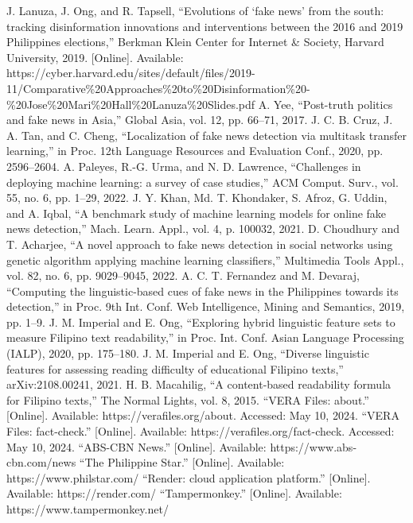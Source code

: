 \documentclass[conference]{IEEEtran}
\begin{document}
\begin{thebibliography}{00}
 J. Lanuza, J. Ong, and R. Tapsell, ``Evolutions of `fake news' from the south: tracking disinformation innovations and interventions between the 2016 and 2019 Philippines elections,'' Berkman Klein Center for Internet \& Society, Harvard University, 2019. [Online]. Available: https://cyber.harvard.edu/sites/default/files/2019-11/Comparative\%20Approaches\%20to\%20Disinformation\%20-\%20Jose\%20Mari\%20Hall\%20Lanuza\%20Slides.pdf
 A. Yee, ``Post-truth politics and fake news in Asia,'' Global Asia, vol. 12, pp. 66--71, 2017.
 J. C. B. Cruz, J. A. Tan, and C. Cheng, ``Localization of fake news detection via multitask transfer learning,'' in Proc. 12th Language Resources and Evaluation Conf., 2020, pp. 2596--2604.
 A. Paleyes, R.-G. Urma, and N. D. Lawrence, ``Challenges in deploying machine learning: a survey of case studies,'' ACM Comput. Surv., vol. 55, no. 6, pp. 1--29, 2022.
 J. Y. Khan, Md. T. Khondaker, S. Afroz, G. Uddin, and A. Iqbal, ``A benchmark study of machine learning models for online fake news detection,'' Mach. Learn. Appl., vol. 4, p. 100032, 2021.
 D. Choudhury and T. Acharjee, ``A novel approach to fake news detection in social networks using genetic algorithm applying machine learning classifiers,'' Multimedia Tools Appl., vol. 82, no. 6, pp. 9029--9045, 2022.
 A. C. T. Fernandez and M. Devaraj, ``Computing the linguistic-based cues of fake news in the Philippines towards its detection,'' in Proc. 9th Int. Conf. Web Intelligence, Mining and Semantics, 2019, pp. 1--9.
 J. M. Imperial and E. Ong, ``Exploring hybrid linguistic feature sets to measure Filipino text readability,'' in Proc. Int. Conf. Asian Language Processing (IALP), 2020, pp. 175--180.
 J. M. Imperial and E. Ong, ``Diverse linguistic features for assessing reading difficulty of educational Filipino texts,'' arXiv:2108.00241, 2021.
 H. B. Macahilig, ``A content-based readability formula for Filipino texts,'' The Normal Lights, vol. 8, 2015.
 ``VERA Files: about.'' [Online]. Available: https://verafiles.org/about. Accessed: May 10, 2024.
 ``VERA Files: fact-check.'' [Online]. Available: https://verafiles.org/fact-check. Accessed: May 10, 2024.
 ``ABS-CBN News.'' [Online]. Available: https://www.abs-cbn.com/news
 ``The Philippine Star.'' [Online]. Available: https://www.philstar.com/
 ``Render: cloud application platform.'' [Online]. Available: https://render.com/
 ``Tampermonkey.'' [Online]. Available: https://www.tampermonkey.net/
\end{thebibliography}
\end{document}
